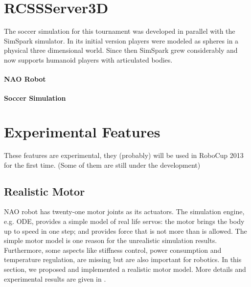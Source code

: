 \documentclass{llncs}
\begin{document}

\section{RCSSServer3D}
\label{s:rcssserver3d}

The soccer simulation for this tournament was developed in parallel with the SimSpark simulator. In its initial version players were modeled as spheres in a physical three dimensional world. Since then SimSpark grew considerably and now supports humanoid players with articulated bodies.

\paragraph{NAO Robot}
\paragraph{Soccer Simulation}

\section{Experimental Features}
\label{s:ongoing}
These features are experimental, they (probably) will be used in RoboCup 2013 for the first time. (Some of them are still under the development)

\subsection{Realistic Motor}
NAO robot has twenty-one motor joints as its actuators.
The simulation engine, e.g. ODE, provides a simple model of real life servos:
the motor brings the body up to speed in one step; and provides force that is not more than is allowed.
The simple motor model is one reason for the unrealistic simulation results.
Furthermore, some aspects like stiffness control, power consumption and temperature regulation, are missing but are also important for robotics.
In this section, we proposed and implemented a realistic motor model. More details and experimental results are given in \cite{Xu2012}.
\end{document}
